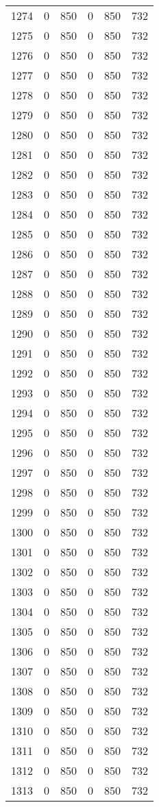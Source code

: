\documentclass[a4paper]{ctexart}
\begin{document}
\begin{longtable}{p{1cm}|p{2cm}|p{2cm}|p{2cm}|P{2cm}|p{2cm}}
		1274&0&850&0&850&732\\
		1275&0&850&0&850&732\\
		1276&0&850&0&850&732\\
		1277&0&850&0&850&732\\
		1278&0&850&0&850&732\\
		1279&0&850&0&850&732\\
		1280&0&850&0&850&732\\
		1281&0&850&0&850&732\\
		1282&0&850&0&850&732\\
		1283&0&850&0&850&732\\
		1284&0&850&0&850&732\\
		1285&0&850&0&850&732\\
		1286&0&850&0&850&732\\
		1287&0&850&0&850&732\\
		1288&0&850&0&850&732\\
		1289&0&850&0&850&732\\
		1290&0&850&0&850&732\\
		1291&0&850&0&850&732\\
		1292&0&850&0&850&732\\
		1293&0&850&0&850&732\\
		1294&0&850&0&850&732\\
		1295&0&850&0&850&732\\
		1296&0&850&0&850&732\\
		1297&0&850&0&850&732\\
		1298&0&850&0&850&732\\
		1299&0&850&0&850&732\\
		1300&0&850&0&850&732\\
		1301&0&850&0&850&732\\
		1302&0&850&0&850&732\\
		1303&0&850&0&850&732\\
		1304&0&850&0&850&732\\
		1305&0&850&0&850&732\\
		1306&0&850&0&850&732\\
		1307&0&850&0&850&732\\
		1308&0&850&0&850&732\\
		1309&0&850&0&850&732\\
		1310&0&850&0&850&732\\
		1311&0&850&0&850&732\\
		1312&0&850&0&850&732\\
		1313&0&850&0&850&732\\

\end{longtable}
\end{document}
